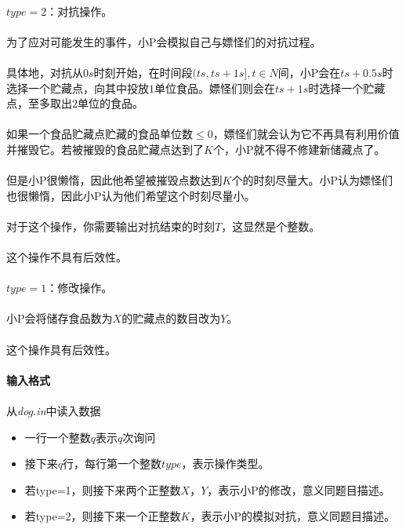 \documentclass[UTF8]{ctexart}
\begin{document}
\paragraph{}$type=2$：对抗操作。
\paragraph{}为了应对可能发生的事件，小P会模拟自己与嫖怪们的对抗过程。
\paragraph{}具体地，对抗从$0s$时刻开始，在时间段$(ts,ts+1s],t\in N$间，小P会在$ts+0.5s$时选择一个贮藏点，向其中投放$1$单位食品。嫖怪们则会在$ts+1s$时选择一个贮藏点，至多取出$2$单位的食品。
\paragraph{}如果一个食品贮藏点贮藏的食品单位数$\leq 0$，嫖怪们就会认为它不再具有利用价值并摧毁它。若被摧毁的食品贮藏点达到了$K$个，小P就不得不修建新储藏点了。
\paragraph{}但是小P很懒惰，因此他希望被摧毁点数达到$K$个的时刻尽量大。小P认为嫖怪们也很懒惰，因此小P认为他们希望这个时刻尽量小。
\paragraph{}对于这个操作，你需要输出对抗结束的时刻$T$，这显然是个整数。
\paragraph{}这个操作不具有后效性。
\paragraph{}$type=1$：修改操作。
\paragraph{}小P会将储存食品数为$X$的贮藏点的数目改为$Y$。
\paragraph{}这个操作具有后效性。
\paragraph{输入格式}
\paragraph{}从\emph{dog.in}中读入数据
\begin{itemize}
	\item 一行一个整数$q$表示$q$次询问
	\item 接下来$q$行，每行第一个整数$type$，表示操作类型。
	\item 若type=1，则接下来两个正整数$X$，$Y$，表示小P的修改，意义同题目描述。
	\item 若type=2，则接下来一个正整数$K$，表示小P的模拟对抗，意义同题目描述。
\end{itemize}
\end{document}
